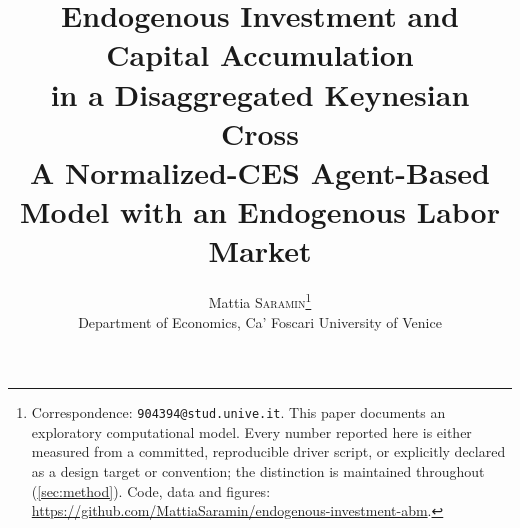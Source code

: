 
\title{\bfseries Endogenous Investment and Capital Accumulation\\[2pt] in a Disaggregated Keynesian Cross\\[6pt] \large A Normalized-CES Agent-Based Model with an Endogenous Labor Market}

\author{%
  Mattia \textsc{Saramin}\thanks{%
  Correspondence: \texttt{904394@stud.unive.it}. This paper documents an exploratory computational model. Every number reported here is either measured from a committed, reproducible driver script, or explicitly declared as a design target or convention; the distinction is maintained throughout (\cref{sec:method}). Code, data and figures: \url{https://github.com/MattiaSaramin/endogenous-investment-abm}.}\\[2pt] \normalsize Department of Economics, Ca' Foscari University of Venice}

\date{}

\maketitle


